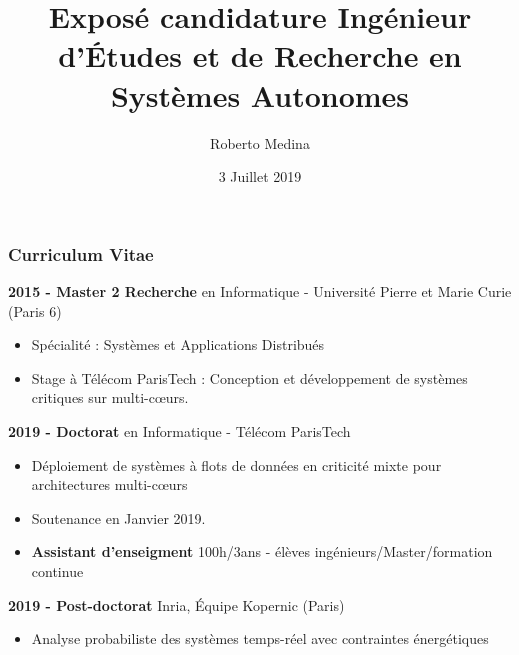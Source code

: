 \documentclass[xcolor=table]{beamer}
\title[]{Exposé candidature 
Ingénieur d'Études et de Recherche en Systèmes Autonomes} %
\author{Roberto Medina} %
\institute[Inria] %
{
Post-doctorant dans l'équipe Kopernic, Inria\\
Docteur en informatique de Télécom ParisTech\\
\medskip
\textit{roberto.medina-bonilla@inria.fr} %
}
\date{3 Juillet 2019} %
\begin{document}
\begin{frame}
\titlepage %
\end{frame}


\begin{frame}
	\frametitle{Curriculum Vitae}
	\textbf{2015 - Master 2 Recherche} en Informatique - 
			Université Pierre et Marie Curie (Paris 6)
		\begin{itemize}
			\item Spécialité : Systèmes et Applications Distribués
			\item Stage à Télécom ParisTech : Conception et développement de 
			systèmes critiques sur multi-c\oe{}urs.
		\end{itemize}
	
	\textbf{2019 - Doctorat} en Informatique - Télécom ParisTech
		\begin{itemize}
			\item Déploiement de systèmes à flots de données en criticité mixte 
			pour architectures multi-c\oe{}urs
			\item Soutenance en Janvier 2019.
			\item \textbf{Assistant d'enseigment} 100h/3ans - élèves 
			ingénieurs/Master/formation continue
		\end{itemize}
	\textbf{2019 - Post-doctorat} Inria, Équipe Kopernic (Paris)
		\begin{itemize}
			\item Analyse probabiliste des systèmes temps-réel avec contraintes 
			énergétiques
		\end{itemize}
\end{frame}

\end{document}
